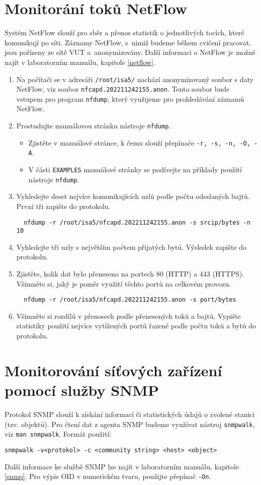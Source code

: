 \documentclass[a4paper,11pt]{article}
\begin{document}
\section{Monitorání toků NetFlow}
Systém NetFlow slouží pro sběr a přenos statistik o jednotlivých tocích, které komunikují po síti. Záznamy NetFlow, s~nimiž budeme během cvičení pracovat, jsou pořízeny ze sítě VUT a~anonymizovány. Další informaci o NetFlow je možné najít v laboratorním manuálu, kapitole \ref{netflow}.
\begin{enumerate}
  \item Na počítači se v adresáři {\tt /root/isa5/} nachází anonymizovaný soubor s daty NetFlow, viz soubor \texttt{nfcapd.202211242155.anon}. Tento soubor bude vstupem pro program  {\tt nfdump}, který využijeme pro prohledávání záznamů NetFlow.
  \item Prostudujte manuálovou stránku nástroje {\tt nfdump}.
    \begin{itemize}
      \item Zjistěte v manuálové stránce, k čemu slouží přepínače {\tt -r, -s, -n, -O, -A}.
      \item V části {\tt EXAMPLES} manuálové stránky se podívejte na příklady použití nástroje {\tt nfdump}.
    \end{itemize}
  \item Vyhledejte deset nejvíce komunikujících uzlů podle počtu odeslaných bajtů. První tři zapište do protokolu. 
\begin{verbatim}
  nfdump -r /root/isa5/nfcapd.202211242155.anon -s srcip/bytes -n 10
\end{verbatim}
  \item Vyhledejte tři uzly s největším počtem přijatých bytů. Výsledek zapište do protokolu.
  \item Zjistěte, kolik dat bylo přeneseno na portech 80 (HTTP) a 443 (HTTPS). Všimněte si, jaký je poměr využití těchto portů na celkovém provozu.
\begin{verbatim}
  nfdump -r /root/isa5/nfcapd.202211242155.anon -s port/bytes 
\end{verbatim}
  \item Všimněte si rozdílů v přenosech podle přenesených toků a bajtů. Vypište statistiky použití nejvíce vytížených portů řazené podle počtu toků a bytů do protokolu.
\end{enumerate}

\section{Monitorování síťových zařízení pomocí služby SNMP}
Protokol SNMP slouží k získání informací či statistických údajů o zvolené stanici (tzv. objektů). Pro čtení dat z agenta SNMP budeme využívat nástroj \texttt{snmpwalk}, viz \texttt{man snmpwalk}. Formát použití:
\begin{verbatim}
snmpwalk -v<protokol> -c <community string> <host> <object>
\end{verbatim}
Další informace ke službě SNMP lze najít v laboratorním manuálu, kapitole \ref{snmp}. Pro výpis OID v numerickém tvaru, použijte přepínač \verb|-On|. 
\end{document}
